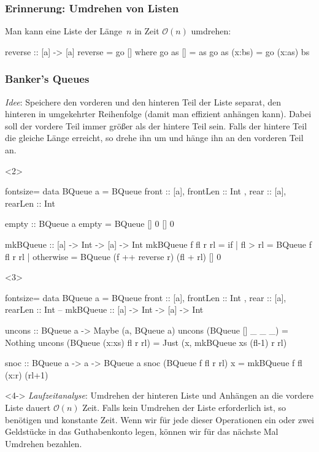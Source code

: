 \documentclass{beamer}
\renewcommand{\O}{\mathcal{O}} %
\begin{document}
\begin{frame}[t,fragile]
  \frametitle{Erinnerung: Umdrehen von Listen}
  Man kann eine Liste der Länge~$n$ in Zeit $\O(n)$ umdrehen:
\begin{haskellcode}
reverse :: [a] -> [a]
reverse = go []
  where go as []     = as
        go as (x:bs) = go (x:as) bs
\end{haskellcode}
\end{frame}

\begin{frame}[t,fragile]
  \frametitle{
    Banker's Queues
    \hfill
  }
  \textit{Idee}: Speichere den vorderen und den hinteren Teil der Liste separat, den hinteren in umgekehrter Reihenfolge (damit man effizient anhängen kann).
  Dabei soll der vordere Teil immer größer als der hintere Teil sein.
  Falls der hintere Teil die gleiche Länge erreicht, so drehe ihn um und hänge ihn an den vorderen Teil an.
\begin{onlyenv}<2>
\begin{haskellcode*}{fontsize=\normalsize}
data BQueue a = BQueue { front :: [a], frontLen :: Int
                       , rear  :: [a], rearLen  :: Int }

empty :: BQueue a
empty = BQueue [] 0 [] 0

mkBQueue :: [a] -> Int -> [a] -> Int
mkBQueue f fl r rl = if
  | fl > rl   = BQueue f fl r rl
  | otherwise = BQueue (f ++ reverse r) (fl + rl) [] 0
\end{haskellcode*}
\end{onlyenv}
\begin{onlyenv}<3>
\begin{haskellcode*}{fontsize=\normalsize}
data BQueue a = BQueue { front :: [a], frontLen :: Int
                       , rear  :: [a], rearLen  :: Int }
-- mkBQueue :: [a] -> Int -> [a] -> Int

uncons :: BQueue a -> Maybe (a, BQueue a)
uncons (BQueue [] _ _ _)       = Nothing
uncons (BQueue (x:xs) fl r rl) =
  Just (x, mkBQueue xs (fl-1) r rl)

snoc :: BQueue a -> a -> BQueue a
snoc (BQueue f fl r rl) x = mkBQueue f fl (x:r) (rl+1)
\end{haskellcode*}
\end{onlyenv}

\begin{onlyenv}<4->
  \vspace{0.5cm}
  \textit{Laufzeitanalyse}: Umdrehen der hinteren Liste und Anhängen an die vordere Liste dauert $\O(n)$ Zeit.
  Falls kein Umdrehen der Liste erforderlich ist, so benötigen  und  konstante Zeit.
  Wenn wir für jede dieser Operationen ein oder zwei Geldstücke in das Guthabenkonto legen, können wir für das nächste Mal Umdrehen bezahlen.
\end{onlyenv}


\end{frame}
\end{document}
